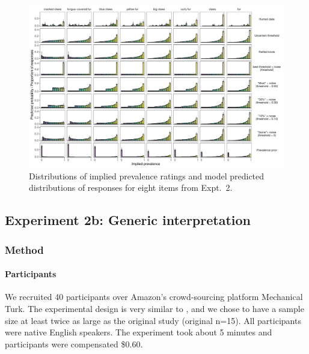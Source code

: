 \documentclass[floatsintext,man]{apa6}
\let\oldparagraph\paragraph
\renewcommand{\paragraph}[1]{\oldparagraph{#1}\mbox{}}
\begin{document}
\begin{figure}
\centering
\includegraphics{figs/cimpian-fullDistributions-variousFixeds-1.pdf}
\caption{Distributions of implied prevalence ratings and model predicted distributions of responses for eight items from Expt.~2.
}
\label{fig:cimpian-modelingResults-bars}
\end{figure}


\subsection{Experiment 2b: Generic interpretation}

\subsubsection{Method}\label{method}

\paragraph{Participants}
We recruited 40 participants over Amazon's crowd-sourcing platform Mechanical Turk.
The experimental design is very similar to , and we chose to have a sample size at least twice as large as the original study (original n=15).
All participants were native English speakers.
The experiment took about 5 minutes and participants were compensated \$0.60.

\end{document}
